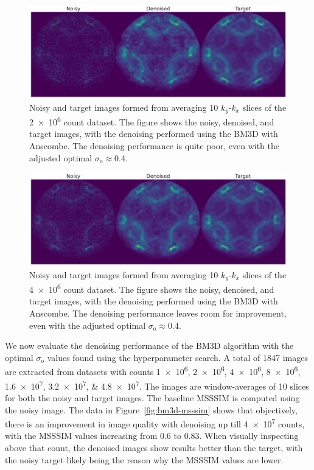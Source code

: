 \begin{figure}[h]
    \centering
    \includegraphics[width=1\linewidth]{images/noisy_denoised_ref_2M_avg_bm3d.pdf}
    \caption{Noisy and target images formed from averaging 10 $k_y$-$k_x$ slices of the \num{2e6} count dataset. The figure shows the noisy, denoised, and target images, with the denoising performed using the \gls{BM3D} with Anscombe. The denoising performance is quite poor, even with the adjusted optimal $\sigma_{\text{o}}\approx0.4$.}
    \label{fig:noisy-denoised-ref-2M-avg-bm3d}
\end{figure}


\begin{figure}[h]
    \centering
    \includegraphics[width=1\linewidth]{images/noisy_denoised_ref_4M_avg_bm3d.pdf}
    \caption{Noisy and target images formed from averaging 10 $k_y$-$k_x$ slices of the \num{4e6} count dataset. The figure shows the noisy, denoised, and target images, with the denoising performed using the \gls{BM3D} with Anscombe. The denoising performance leaves room for improvement, even with the adjusted optimal $\sigma_{\text{o}}\approx0.4$.}
    \label{fig:noisy-denoised-ref-4M-avg-bm3d}
\end{figure}


We now evaluate the denoising performance of the \gls{BM3D} algorithm with the optimal $\sigma_{\text{o}}$ values found using the hyperparameter search. A total of \num{1847} images are extracted from datasets with counts \numlist{1e6;2e6;4e6;8e6;1.6e7;3.2e7;4.8e7}. The images are window-averages of 10 slices for both the noisy and target images. The baseline \gls{MSSSIM} is computed using the noisy image. The data in Figure~\ref{fig:bm3d-msssim} shows that objectively, there is an improvement in image quality with denoising up till \num{4e7} counts, with the \gls{MSSSIM} values increasing from \num{0.6} to \num{0.83}. When visually inspecting above that count, the denoised images show results better than the target, with the noisy target likely being the reason why the \gls{MSSSIM} values are lower. 

